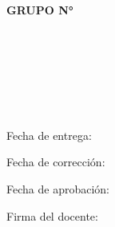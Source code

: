 

\begin{titlepage}
    \begin{center}
        \unidad
        
        \Large
        \titulo
        
        \end{center}
        \vspace{0.7cm}
        \normalsize    
        \textbf{GRUPO N° \grupo}\\
        \vspace{0.1cm}\\
        \noindent
        \autorUNO\\
        \autorDOS\\
        \autorTRES\\
        \autorCUATRO\\
        \autorCINCO\\
        \vspace{0.3cm}\\
        \noindent
            Fecha de entrega: \fecha 
            
        \noindent
            Fecha de corrección:
        \indent
        \bigskip
        
        \bigskip
        
        \noindent
        Fecha de aprobación:
        
        \medskip
        \noindent
        Firma del docente:
        
\end{titlepage}

